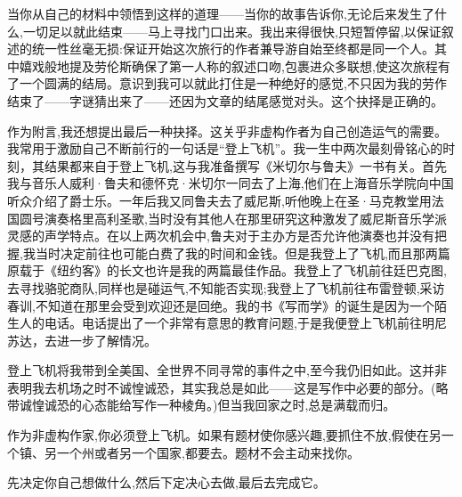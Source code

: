 当你从自己的材料中领悟到这样的道理——当你的故事告诉你,无论后来发生了什么,一切足以就此结束——马上寻找门口出来。我出来得很快,只短暂停留,以保证叙述的统一性丝毫无损:保证开始这次旅行的作者兼导游自始至终都是同一个人。其中嬉戏般地提及劳伦斯确保了第一人称的叙述口吻,包裹进众多联想,使这次旅程有了一个圆满的结局。意识到我可以就此打住是一种绝好的感觉,不只因为我的劳作结束了——字谜猜出来了——还因为文章的结尾感觉对头。这个抉择是正确的。

作为附言,我还想提出最后一种抉择。这关乎非虚构作者为自己创造运气的需要。我常用于激励自己不断前行的一句话是“登上飞机”。我一生中两次最刻骨铭心的时刻，其结果都来自于登上飞机,这与我准备撰写《米切尔与鲁夫》一书有关。首先我与音乐人威利·鲁夫和德怀克·米切尔一同去了上海,他们在上海音乐学院向中国听众介绍了爵士乐。一年后我又同鲁夫去了威尼斯,听他晚上在圣·马克教堂用法国圆号演奏格里高利圣歌,当时没有其他人在那里研究这种激发了威尼斯音乐学派灵感的声学特点。在以上两次机会中,鲁夫对于主办方是否允许他演奏也并没有把握,我当时决定前往也可能白费了我的时间和金钱。但是我登上了飞机,而且那两篇原载于《纽约客》的长文也许是我的两篇最佳作品。我登上了飞机前往廷巴克图,去寻找骆驼商队,同样也是碰运气,不知能否实现;我登上了飞机前往布雷登顿,采访春训,不知道在那里会受到欢迎还是回绝。我的书《写而学》的诞生是因为一个陌生人的电话。电话提出了一个非常有意思的教育问题,于是我便登上飞机前往明尼苏达，去进一步了解情况。

登上飞机将我带到全美国、全世界不同寻常的事件之中,至今我仍旧如此。这并非表明我去机场之时不诚惶诚恐，其实我总是如此——这是写作中必要的部分。(略带诚惶诚恐的心态能给写作一种棱角。)但当我回家之时,总是满载而归。

作为非虚构作家,你必须登上飞机。如果有题材使你感兴趣,要抓住不放,假使在另一个镇、另一个州或者另一个国家,都要去。题材不会主动来找你。

先决定你自己想做什么,然后下定决心去做,最后去完成它。